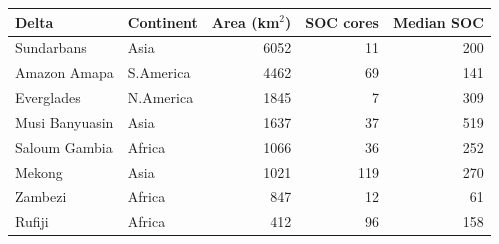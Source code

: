 \begin{tabular}{llrrr}
\toprule
Delta & Continent & Area (km$^2$) & SOC cores & Median SOC \\
\midrule
Sundarbans & Asia & 6052 & 11 & 200 \\
Amazon Amapa & S.America & 4462 & 69 & 141 \\
Everglades & N.America & 1845 & 7 & 309 \\
Musi Banyuasin & Asia & 1637 & 37 & 519 \\
Saloum Gambia & Africa & 1066 & 36 & 252 \\
Mekong & Asia & 1021 & 119 & 270 \\
Zambezi & Africa & 847 & 12 & 61 \\
Rufiji & Africa & 412 & 96 & 158 \\
\bottomrule
\end{tabular}
